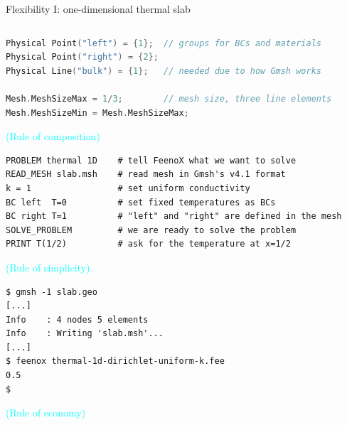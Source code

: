 \documentclass[
  ignorenonframetext,
  aspectratio=169,
]{beamer}
\begin{document}
\begin{frame}[fragile]{Flexibility I: one-dimensional thermal slab}
\begin{columns}[T]
\begin{column}{0.55\textwidth}
\begin{lstlisting}[language=C, style=c]
Physical Point("left") = {1};  // groups for BCs and materials
Physical Point("right") = {2};
Physical Line("bulk") = {1};   // needed due to how Gmsh works

Mesh.MeshSizeMax = 1/3;        // mesh size, three line elements
Mesh.MeshSizeMin = Mesh.MeshSizeMax;
\end{lstlisting}

\vspace{-0.25cm}\hfill{\footnotesize\textcolor{cyan}{(Rule of {composition})}}

\begin{lstlisting}[style=feenox]
PROBLEM thermal 1D    # tell FeenoX what we want to solve 
READ_MESH slab.msh    # read mesh in Gmsh's v4.1 format
k = 1                 # set uniform conductivity
BC left  T=0          # set fixed temperatures as BCs
BC right T=1          # "left" and "right" are defined in the mesh
SOLVE_PROBLEM         # we are ready to solve the problem
PRINT T(1/2)          # ask for the temperature at x=1/2
\end{lstlisting}

\vspace{-0.25cm}\hfill{\footnotesize\textcolor{cyan}{(Rule of {simplicity})}}

\begin{lstlisting}[style=terminal]
$ gmsh -1 slab.geo
[...]
Info    : 4 nodes 5 elements
Info    : Writing 'slab.msh'...
[...]
$ feenox thermal-1d-dirichlet-uniform-k.fee 
0.5
$ 
\end{lstlisting}

\vspace{-0.25cm}\hfill{\footnotesize\textcolor{cyan}{(Rule of {economy})}}
\end{column}
\end{columns}
\end{frame}
\end{document}
